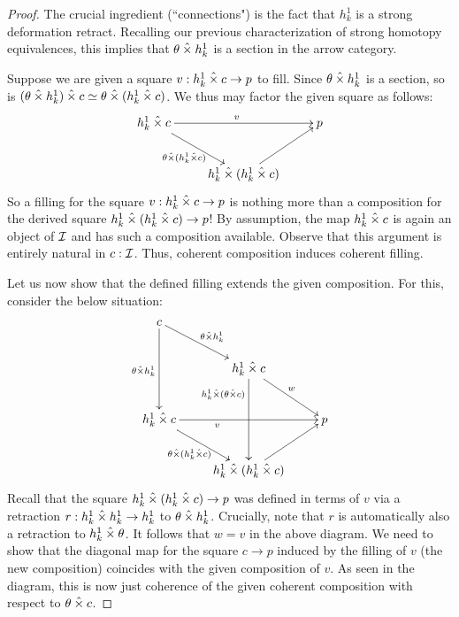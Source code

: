 \documentclass[reqno,10pt,a4paper,oneside]{amsart}
\begin{document}
\begin{proof}
The crucial ingredient (``connections") is the fact that $h_k^1$ is a strong deformation retract.
Recalling our previous characterization of strong homotopy equivalences, this implies that $\theta \hattimes h_k^1$ is a section in the arrow category.

Suppose we are given a square $v : h_k^1 \hattimes c \to p$ to fill.
Since $\theta \hattimes h_k^1$ is a section, so is $(\theta \hattimes h_k^1) \hattimes c \simeq \theta \hattimes (h_k^1 \hattimes c)$.
We thus may factor the given square as follows:
\[
\xymatrix{
  h_k^1 \hattimes c
  \ar[rr]^{v}
  \ar[dr]_{\theta \hattimes (h_k^1 \hattimes c)}
&&
  p
\\&
  h_k^1 \hattimes (h_k^1 \hattimes c)
  \ar[ur]
}
\]
So a filling for the square $v : h_k^1 \hattimes c \to p$ is nothing more than a composition for the derived square $h_k^1 \hattimes (h_k^1 \hattimes c) \to p$!
By assumption, the map $h_k^1 \hattimes c$ is again an object of $\cal{I}$ and has such a composition available.
Observe that this argument is entirely natural in $c : \cal{I}$.
Thus, coherent composition induces coherent filling.

Let us now show that the defined filling extends the given composition.
For this, consider the below situation:
\[
\xymatrix{
  c
  \ar[dr]^{\theta \hattimes h_k^1}
  \ar[dd]_{\theta \hattimes h_k^1}
\\&
  h_k^1 \hattimes c
  \ar[dd]_(0.25){h_k^1 \hattimes (\theta \hattimes c)}
  \ar[dr]^{w}
\\
  h_k^1 \hattimes c
  \ar[rr]_(0.35){v}
  \ar[dr]_{\theta \hattimes (h_k^1 \hattimes c)}
&&
  p
\\&
  h_k^1 \hattimes (h_k^1 \hattimes c)
  \ar[ur]
}
\]
Recall that the square $h_k^1 \hattimes (h_k^1 \hattimes c) \to p$ was defined in terms of $v$ via a retraction $r : h_k^1 \hattimes h_k^1 \to h_k^1$ to $\theta \hattimes h_k^1$.
Crucially, note that $r$ is automatically also a retraction to $h_k^1 \hattimes \theta$.
It follows that $w = v$ in the above diagram.
We need to show that the diagonal map for the square $c \to p$ induced by the filling of $v$ (the new composition) coincides with the given composition of $v$.
As seen in the diagram, this is now just coherence of the given coherent composition with respect to $\theta \hattimes c$.
\end{proof}
\end{document}
